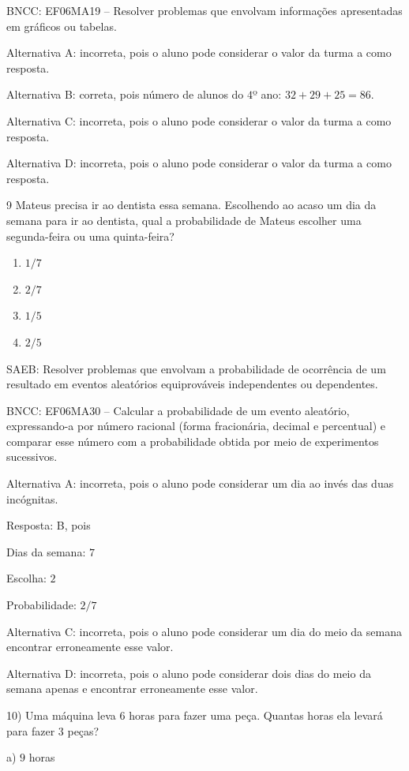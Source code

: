 BNCC: EF06MA19 -- Resolver problemas que envolvam informações
apresentadas em gráficos ou tabelas.

Alternativa A: incorreta, pois o aluno pode considerar o valor da turma
a como resposta.

Alternativa B: correta, pois número de alunos do $4$º ano: $32 + 29 + 25 = 86$.

Alternativa C: incorreta, pois o aluno pode considerar o valor da turma
a como resposta.

Alternativa D: incorreta, pois o aluno pode considerar o valor da turma
a como resposta.

\num{9}  Mateus precisa ir ao dentista essa semana. Escolhendo ao acaso um dia
da semana para ir ao dentista, qual a probabilidade de Mateus escolher
uma segunda-feira ou uma quinta-feira?

\begin{enumerate}
\def\labelenumi{\alph{enumi}.}
\item
  $1/7$
\item
  $2/7$
\item
  $1/5$
\item
  $2/5$
\end{enumerate}

SAEB: Resolver problemas que envolvam a probabilidade de ocorrência de
um resultado em eventos aleatórios equiprováveis independentes ou
dependentes.

BNCC: EF06MA30 -- Calcular a probabilidade de um evento aleatório,
expressando-a por número racional (forma fracionária, decimal e
percentual) e comparar esse número com a probabilidade obtida por meio
de experimentos sucessivos.

Alternativa A: incorreta, pois o aluno pode considerar um dia ao invés
das duas incógnitas.

Resposta: B, pois

Dias da semana: $7$

Escolha: $2$

Probabilidade: $2/7$

Alternativa C: incorreta, pois o aluno pode considerar um dia do meio da
semana encontrar erroneamente esse valor.

Alternativa D: incorreta, pois o aluno pode considerar dois dias do meio
da semana apenas e encontrar erroneamente esse valor.

10) Uma máquina leva $6$ horas para fazer uma peça. Quantas horas ela
levará para fazer $3$ peças?

a) $9$ horas

